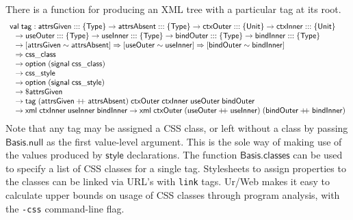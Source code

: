\documentclass{article}
\newcommand{\cd}[1]{\texttt{#1}}
\newcommand{\mt}[1]{\mathsf{#1}}
\newcommand{\rc}{+ \hspace{-.075in} + \;}
\begin{document}
There is a function for producing an XML tree with a particular tag at its root.
$$\begin{array}{l}
  \mt{val} \; \mt{tag} : \mt{attrsGiven} ::: \{\mt{Type}\} \to \mt{attrsAbsent} ::: \{\mt{Type}\} \to \mt{ctxOuter} ::: \{\mt{Unit}\} \to \mt{ctxInner} ::: \{\mt{Unit}\} \\
  \hspace{.1in} \to \mt{useOuter} ::: \{\mt{Type}\} \to \mt{useInner} ::: \{\mt{Type}\} \to \mt{bindOuter} ::: \{\mt{Type}\} \to \mt{bindInner} ::: \{\mt{Type}\} \\
  \hspace{.1in} \to [\mt{attrsGiven} \sim \mt{attrsAbsent}] \Rightarrow [\mt{useOuter} \sim \mt{useInner}] \Rightarrow [\mt{bindOuter} \sim \mt{bindInner}] \\
  \hspace{.1in} \Rightarrow \mt{css\_class} \\
  \hspace{.1in} \to \mt{option} \; (\mt{signal} \; \mt{css\_class}) \\
  \hspace{.1in} \to \mt{css\_style} \\
  \hspace{.1in} \to \mt{option} \; (\mt{signal} \; \mt{css\_style}) \\
  \hspace{.1in} \to \$\mt{attrsGiven} \\
  \hspace{.1in} \to \mt{tag} \; (\mt{attrsGiven} \rc \mt{attrsAbsent}) \; \mt{ctxOuter} \; \mt{ctxInner} \; \mt{useOuter} \; \mt{bindOuter} \\
  \hspace{.1in} \to \mt{xml} \; \mt{ctxInner} \; \mt{useInner} \; \mt{bindInner} \to \mt{xml} \; \mt{ctxOuter} \; (\mt{useOuter} \rc \mt{useInner}) \; (\mt{bindOuter} \rc \mt{bindInner})
\end{array}$$
Note that any tag may be assigned a CSS class, or left without a class by passing $\mt{Basis.null}$ as the first value-level argument.  This is the sole way of making use of the values produced by $\mt{style}$ declarations.  The function $\mt{Basis.classes}$ can be used to specify a list of CSS classes for a single tag.  Stylesheets to assign properties to the classes can be linked via URL's with \texttt{link} tags.  Ur/Web makes it easy to calculate upper bounds on usage of CSS classes through program analysis, with the \cd{-css} command-line flag.
\end{document}
